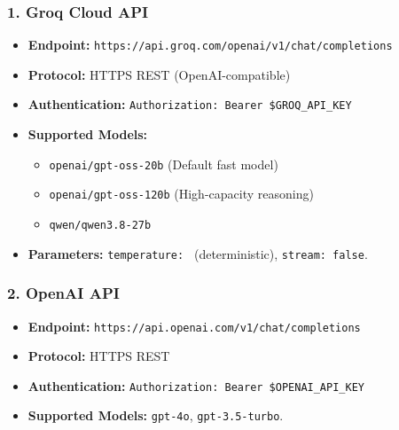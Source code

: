 \documentclass[
]{article}
\providecommand{\tightlist}{%
  \setlength{\itemsep}{0pt}\setlength{\parskip}{0pt}}
\begin{document}
\subsubsection{1. Groq Cloud API}\label{groq-cloud-api}

\begin{itemize}
\tightlist
\item
  \textbf{Endpoint:}
  \texttt{https:/\allowbreak /\allowbreak api.\allowbreak groq.\allowbreak com/\allowbreak openai/\allowbreak v1/\allowbreak chat/\allowbreak completions}
\item
  \textbf{Protocol:} HTTPS REST (OpenAI-compatible)
\item
  \textbf{Authentication:}
  \texttt{Authorization:\ \allowbreak Bearer\ \allowbreak \$GROQ\_\allowbreak API\_\allowbreak KEY}
\item
  \textbf{Supported Models:}

  \begin{itemize}
  \tightlist
  \item
    \texttt{openai/\allowbreak gpt-oss-20b} (Default fast model)
  \item
    \texttt{openai/\allowbreak gpt-oss-120b} (High-capacity reasoning)
  \item
    \texttt{qwen/\allowbreak qwen3.8-27b}
  \end{itemize}
\item
  \textbf{Parameters:} \texttt{temperature:\ } (deterministic),
  \texttt{stream:\ \allowbreak false}.
\end{itemize}

\subsubsection{2. OpenAI API}\label{openai-api}

\begin{itemize}
\tightlist
\item
  \textbf{Endpoint:} \texttt{https:/\allowbreak /\allowbreak api.\allowbreak openai.\allowbreak com/\allowbreak v1/\allowbreak chat/\allowbreak completions}
\item
  \textbf{Protocol:} HTTPS REST
\item
  \textbf{Authentication:}
  \texttt{Authorization:\ \allowbreak Bearer\ \allowbreak \$OPENAI\_\allowbreak API\_\allowbreak KEY}
\item
  \textbf{Supported Models:} \texttt{gpt-4o}, \texttt{gpt-3.5-turbo}.
\end{itemize}
\end{document}
